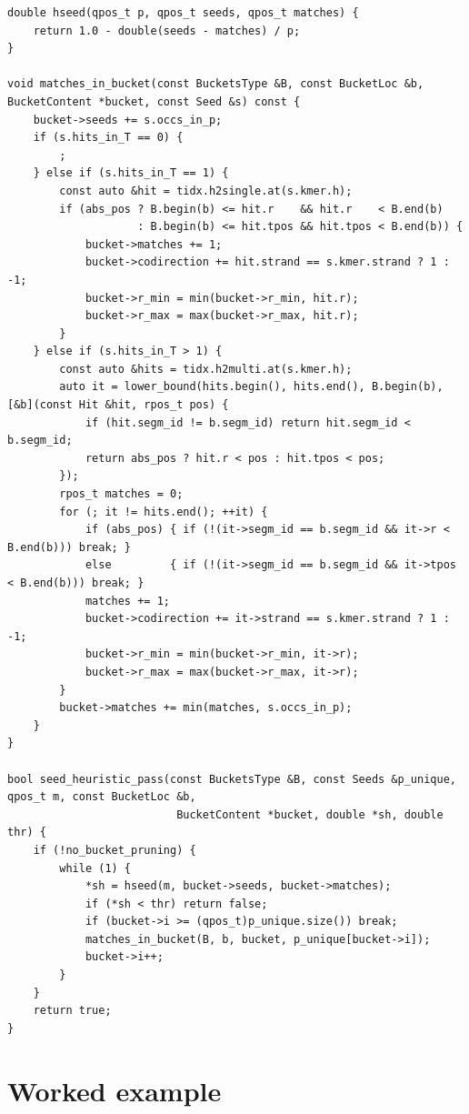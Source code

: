 \begin{lstlisting}[style=cppstyle,caption={\code{hseed}, \code{matches\_in\_bucket}, \code{seed\_heuristic\_pass}, \texttt{src/shmap.h}}]
double hseed(qpos_t p, qpos_t seeds, qpos_t matches) {
    return 1.0 - double(seeds - matches) / p;
}

void matches_in_bucket(const BucketsType &B, const BucketLoc &b, BucketContent *bucket, const Seed &s) const {
    bucket->seeds += s.occs_in_p;
    if (s.hits_in_T == 0) {
        ;
    } else if (s.hits_in_T == 1) {
        const auto &hit = tidx.h2single.at(s.kmer.h);
        if (abs_pos ? B.begin(b) <= hit.r    && hit.r    < B.end(b)
                    : B.begin(b) <= hit.tpos && hit.tpos < B.end(b)) {
            bucket->matches += 1;
            bucket->codirection += hit.strand == s.kmer.strand ? 1 : -1;
            bucket->r_min = min(bucket->r_min, hit.r);
            bucket->r_max = max(bucket->r_max, hit.r);
        }
    } else if (s.hits_in_T > 1) {
        const auto &hits = tidx.h2multi.at(s.kmer.h);
        auto it = lower_bound(hits.begin(), hits.end(), B.begin(b), [&b](const Hit &hit, rpos_t pos) {
            if (hit.segm_id != b.segm_id) return hit.segm_id < b.segm_id;
            return abs_pos ? hit.r < pos : hit.tpos < pos;
        });
        rpos_t matches = 0;
        for (; it != hits.end(); ++it) {
            if (abs_pos) { if (!(it->segm_id == b.segm_id && it->r < B.end(b))) break; }
            else         { if (!(it->segm_id == b.segm_id && it->tpos < B.end(b))) break; }
            matches += 1;
            bucket->codirection += it->strand == s.kmer.strand ? 1 : -1;
            bucket->r_min = min(bucket->r_min, it->r);
            bucket->r_max = max(bucket->r_max, it->r);
        }
        bucket->matches += min(matches, s.occs_in_p);
    }
}

bool seed_heuristic_pass(const BucketsType &B, const Seeds &p_unique, qpos_t m, const BucketLoc &b,
                          BucketContent *bucket, double *sh, double thr) {
    if (!no_bucket_pruning) {
        while (1) {
            *sh = hseed(m, bucket->seeds, bucket->matches);
            if (*sh < thr) return false;
            if (bucket->i >= (qpos_t)p_unique.size()) break;
            matches_in_bucket(B, b, bucket, p_unique[bucket->i]);
            bucket->i++;
        }
    }
    return true;
}
\end{lstlisting}

\section{Worked example}

